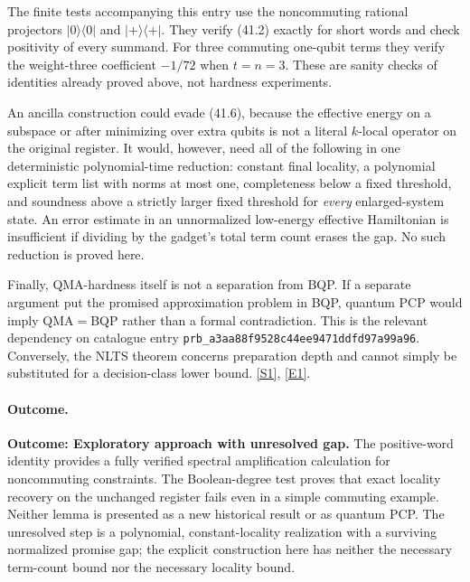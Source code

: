\documentclass[11pt,a4paper]{article}
\newcommand{\sref}[2]{\hyperlink{source:#1:#2}{[S#2]}}
\newcommand{\eref}[2]{\hyperlink{extra:#1:#2}{[E#2]}}
\numberwithin{equation}{section}
\begin{document}
The finite tests accompanying this entry use the noncommuting rational
projectors $|0\rangle\langle0|$ and $|+\rangle\langle+|$. They verify
(41.2) exactly for short words and check positivity of every summand.
For three commuting one-qubit terms they verify the weight-three
coefficient $-1/72$ when $t=n=3$. These are sanity checks of identities
already proved above, not hardness experiments.

An ancilla construction could evade (41.6), because the effective energy
on a subspace or after minimizing over extra qubits is not a literal
$k$-local operator on the original register. It would, however, need all
of the following in one deterministic polynomial-time reduction:
constant final locality, a polynomial explicit term list with norms at
most one, completeness below a fixed threshold, and soundness above a
strictly larger fixed threshold for \emph{every} enlarged-system state.
An error estimate in an unnormalized low-energy effective Hamiltonian is
insufficient if dividing by the gadget's total term count erases the gap.
No such reduction is proved here.

Finally, QMA-hardness itself is not a separation from BQP. If a separate
argument put the promised approximation problem in BQP, quantum PCP would
imply QMA$=$BQP rather than a formal contradiction. This is the relevant
dependency on catalogue entry \texttt{prb\_a3aa88f9528c44ee9471ddfd97a99a96}. Conversely, the NLTS theorem concerns preparation
depth and cannot simply be substituted for a decision-class lower bound.
\sref{statement}{1}, \eref{statement}{1}.

\paragraph{Outcome.}
\textbf{Outcome: Exploratory approach with unresolved gap.}
The positive-word identity provides a fully verified spectral
amplification calculation for noncommuting constraints. The Boolean-degree
test proves that exact locality recovery on the unchanged register fails
even in a simple commuting example. Neither lemma is presented as a new
historical result or as quantum PCP. The unresolved step is a polynomial,
constant-locality realization with a surviving normalized promise gap;
the explicit construction here has neither the necessary term-count bound
nor the necessary locality bound.
\end{document}
